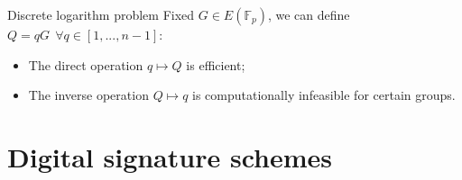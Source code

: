 \documentclass[slidescentered]{beamer}
\begin{document}
    
    \begin{frame}{Discrete logarithm problem}
    	Fixed $G \in E(\mathbb{F}_p)$, we can define $Q = qG \ \ \forall q \in [1, ..., n - 1]$:
    	\begin{itemize}
    		\item<2-> The direct operation $q \mapsto Q$ is efficient;
    		\item<3-> The inverse operation $Q \mapsto q$ is computationally infeasible for certain groups.
    	\end{itemize}
    	

		\bigskip
		
	\end{frame}
    
    \section{Digital signature schemes}
    
\end{document}

